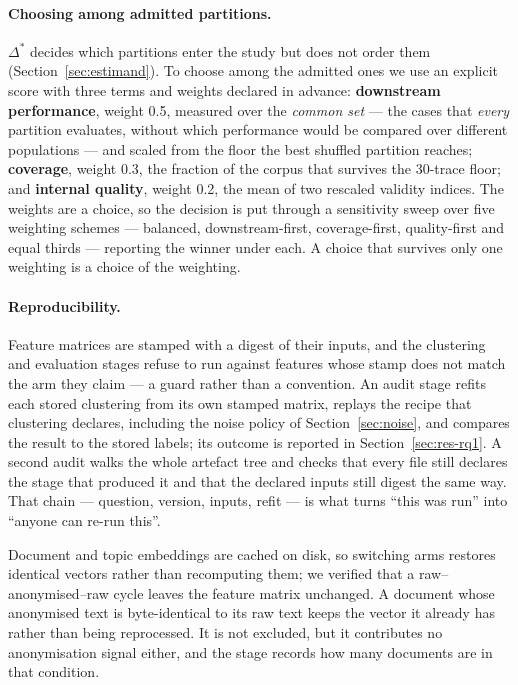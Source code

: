 \paragraph{Choosing among admitted partitions.}
$\Delta^{*}$ decides which partitions enter the study but does not order them
(Section~\ref{sec:estimand}). To choose among the admitted ones we use an explicit score with
three terms and weights declared in advance: \textbf{downstream performance}, weight 0.5,
measured over the \emph{common set} --- the cases that \emph{every} partition evaluates, without
which performance would be compared over different populations --- and scaled from the floor the
best shuffled partition reaches; \textbf{coverage}, weight 0.3, the fraction of the corpus that
survives the 30-trace floor; and \textbf{internal quality}, weight 0.2, the mean of two rescaled
validity indices. The weights are a choice, so the decision is put through a sensitivity sweep
over five weighting schemes --- balanced, downstream-first, coverage-first, quality-first and
equal thirds --- reporting the winner under each. A choice that survives only one weighting is a
choice of the weighting.

\paragraph{Reproducibility.}
Feature matrices are stamped with a digest of their inputs, and the clustering and evaluation
stages refuse to run against features whose stamp does not match the arm they claim --- a guard
rather than a convention. An audit stage refits each stored clustering from its own stamped
matrix, replays the recipe that clustering declares, including the noise policy of
Section~\ref{sec:noise}, and compares the result to the stored labels; its outcome is reported in
Section~\ref{sec:res-rq1}. A second audit walks the whole artefact tree and checks that every
file still declares the stage that produced it and that the declared inputs still digest the same
way. That chain --- question, version, inputs, refit --- is what turns ``this was run'' into
``anyone can re-run this''.

Document and topic embeddings are cached on disk, so switching arms restores identical vectors
rather than recomputing them; we verified that a raw--anonymised--raw cycle leaves the feature
matrix unchanged. A document whose anonymised text is byte-identical to its raw text keeps the
vector it already has rather than being reprocessed. It is not excluded, but it contributes no
anonymisation signal either, and the stage records how many documents are in that condition.

